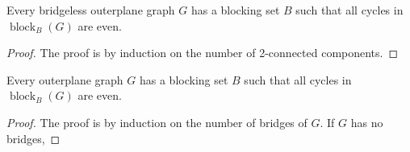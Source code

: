 \documentclass{patmorin}
\DeclareMathOperator{\block}{block}
\begin{document}
\begin{lem}
  Every bridgeless outerplane graph $G$ has a blocking set $B$ such
  that all cycles in $\block_B(G)$ are even.
\end{lem}

\begin{proof}
  The proof is by induction on the number of 2-connected components.
\end{proof}

\begin{lem}
  Every outerplane graph $G$ has a blocking set $B$ such that all cycles
  in $\block_B(G)$ are even.
\end{lem}

\begin{proof}
  The proof is by induction on the number of bridges of $G$.  If $G$ has no bridges, 
\end{proof}




\end{document}
